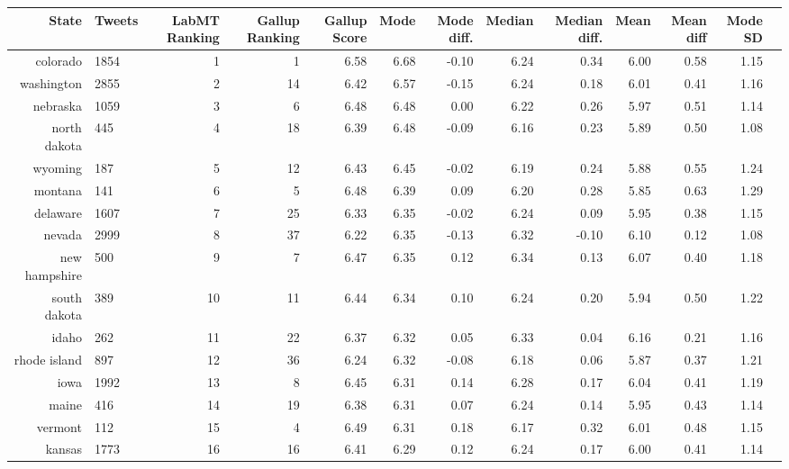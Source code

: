\documentclass{llncs}
\begin{document}
\begin{landscape}

\begin{table}
\centering
\begin{tabular}{rlrrrrrrrrrrr}
  \hline
 State & Tweets & LabMT Ranking & Gallup Ranking & Gallup Score & Mode & Mode diff. & Median & Median diff. & Mean & Mean diff & Mode SD \\
  \hline
    colorado & 1854 &   1 &   1 & 6.58 & 6.68 & -0.10 & 6.24 & 0.34 & 6.00 & 0.58 & 1.15 \\
    washington & 2855 &   2 &  14 & 6.42 & 6.57 & -0.15 & 6.24 & 0.18 & 6.01 & 0.41 & 1.16 \\
    nebraska & 1059 &   3 &   6 & 6.48 & 6.48 & 0.00 & 6.22 & 0.26 & 5.97 & 0.51 & 1.14 \\
    north dakota & 445 &   4 &  18 & 6.39 & 6.48 & -0.09 & 6.16 & 0.23 & 5.89 & 0.50 & 1.08 \\
    wyoming & 187 &   5 &  12 & 6.43 & 6.45 & -0.02 & 6.19 & 0.24 & 5.88 & 0.55 & 1.24 \\
    montana & 141 &   6 &   5 & 6.48 & 6.39 & 0.09 & 6.20 & 0.28 & 5.85 & 0.63 & 1.29 \\
    delaware & 1607 &   7 &  25 & 6.33 & 6.35 & -0.02 & 6.24 & 0.09 & 5.95 & 0.38 & 1.15 \\
    nevada & 2999 &   8 &  37 & 6.22 & 6.35 & -0.13 & 6.32 & -0.10 & 6.10 & 0.12 & 1.08 \\
    new hampshire & 500 &   9 &   7 & 6.47 & 6.35 & 0.12 & 6.34 & 0.13 & 6.07 & 0.40 & 1.18 \\
    south dakota & 389 &  10 &  11 & 6.44 & 6.34 & 0.10 & 6.24 & 0.20 & 5.94 & 0.50 & 1.22 \\
    idaho & 262 &  11 &  22 & 6.37 & 6.32 & 0.05 & 6.33 & 0.04 & 6.16 & 0.21 & 1.16 \\
    rhode island & 897 &  12 &  36 & 6.24 & 6.32 & -0.08 & 6.18 & 0.06 & 5.87 & 0.37 & 1.21 \\
    iowa & 1992 &  13 &   8 & 6.45 & 6.31 & 0.14 & 6.28 & 0.17 & 6.04 & 0.41 & 1.19 \\
    maine & 416 &  14 &  19 & 6.38 & 6.31 & 0.07 & 6.24 & 0.14 & 5.95 & 0.43 & 1.14 \\
    vermont & 112 &  15 &   4 & 6.49 & 6.31 & 0.18 & 6.17 & 0.32 & 6.01 & 0.48 & 1.15 \\
    kansas & 1773 &  16 &  16 & 6.41 & 6.29 & 0.12 & 6.24 & 0.17 & 6.00 & 0.41 & 1.14 \\

\end{tabular}
\end{table}
\end{landscape}
\end{document}
